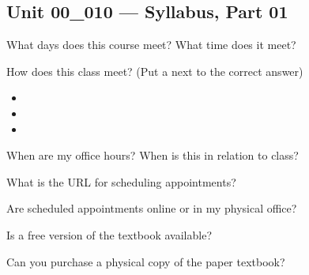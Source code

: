 \documentclass[letterpaper,12pt]{exam}
\newcommand{\unit}{Unit 00}
\begin{document}
\begin{questions}

\section*{\unit\_010 --- Syllabus, Part 01} %

\begin{samepage}
	\question What days does this course meet?  What time does it meet?
	\vspace{5mm}
\end{samepage}

\begin{samepage}
	\question How does this class meet? (Put a \checkmark next to the correct answer)
	  \begin{itemize}
		\item {}
		\vspace{5mm}
		\item {}
		\vspace{5mm}
		\item {}
		\vspace{5mm}
	   \end{itemize}
\end{samepage}

\begin{samepage}
	\question When are my office hours?  When is this in relation to class?
	\vspace{5mm}
\end{samepage}

\begin{samepage}
	\question What is the URL for scheduling appointments?
	\vspace{5mm}
\end{samepage}

\begin{samepage}
	\question Are scheduled appointments online or in my physical office?
	\vspace{5mm}
\end{samepage}

\begin{samepage}
	\question Is a free version of the textbook available?
	\vspace{5mm}
\end{samepage}

\begin{samepage}
	\question Can you purchase a physical copy of the paper textbook?
	\vspace{5mm}
\end{samepage}


\end{questions}
\end{document}
